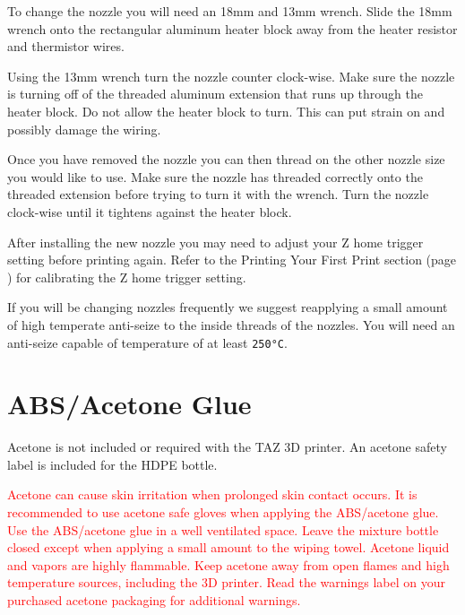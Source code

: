 To change the nozzle you will need an 18mm and 13mm wrench. Slide the 18mm wrench onto the rectangular aluminum heater block away from the heater resistor and thermistor wires.

Using the 13mm wrench turn the nozzle counter clock-wise. Make sure the nozzle is turning off of the threaded aluminum extension that runs up through the heater block. Do not allow the heater block to turn. This can put strain on and possibly damage the wiring.

Once you have removed the nozzle you can then thread on the other nozzle size you would like to use. Make sure the nozzle has threaded correctly onto the threaded extension before trying to turn it with the wrench. Turn the nozzle clock-wise until it tightens against the heater block.

After installing the new nozzle you may need to adjust your Z home trigger setting before printing again. Refer to the Printing Your First Print section (page \pageref{firstprint}) for calibrating the Z home trigger setting.

If you will be changing nozzles frequently we suggest reapplying a small amount of high temperate anti-seize to the inside threads of the nozzles. You will need an anti-seize capable of temperature of at least \texttt{250°C}.

\section{ABS/Acetone Glue}
\label{sec:ABS/Acetone Glue}
Acetone is not included or required with the TAZ 3D printer. An acetone safety label is included for the HDPE bottle.

\textcolor{red}{Acetone can cause skin irritation when prolonged skin contact occurs. It is recommended to use acetone safe gloves when applying the ABS/acetone glue. Use the ABS/acetone glue in a well ventilated space. Leave the mixture bottle closed except when applying a small amount to the wiping towel. Acetone liquid and vapors are highly flammable. Keep acetone away from open flames and high temperature sources, including the 3D printer. Read the warnings label on your purchased acetone packaging for additional warnings.}

